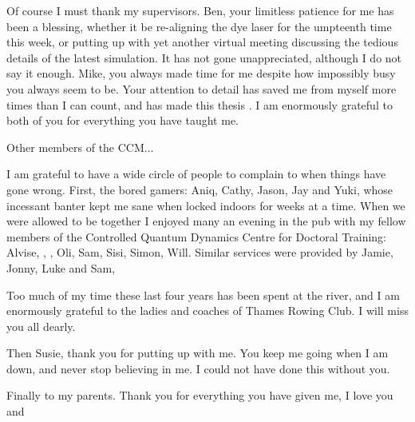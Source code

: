 Of course I must thank my supervisors. Ben, your limitless patience for me has
been a blessing, whether it be re-aligning the dye laser for the umpteenth time
this week, or putting up with yet another virtual meeting discussing the
tedious details of the latest simulation. It has not gone unappreciated,
although I do not say it enough. Mike, you always made time for me despite how
impossibly busy you always seem to be. Your attention to detail has saved me
from myself more times than I can count, and has made this thesis .
I am enormously grateful to both of you for everything you have taught me.

Other members of the CCM...


I am grateful to have a wide circle of people to complain to when things have
gone wrong.  First, the bored gamers: Aniq, Cathy, Jason, Jay and Yuki, whose
incessant banter kept me sane when locked indoors for weeks at a time. When we
were allowed to be together I enjoyed many an evening in the pub with my fellow
members of the Controlled Quantum Dynamics Centre for Doctoral Training:
Alvise, , , Oli, Sam, Sisi, Simon, Will. Similar services
were provided by Jamie, Jonny, Luke and Sam, 

Too much of my time these last four years has been spent at the river, and I am
enormously grateful to the ladies and coaches of Thames Rowing Club. I will
miss you all dearly.

Then Susie, thank you for putting up with me. You keep me going when I am down,
and never stop believing in me. I could not have done this without you.

Finally to my parents. Thank you for everything you have given me, I love you
and 


